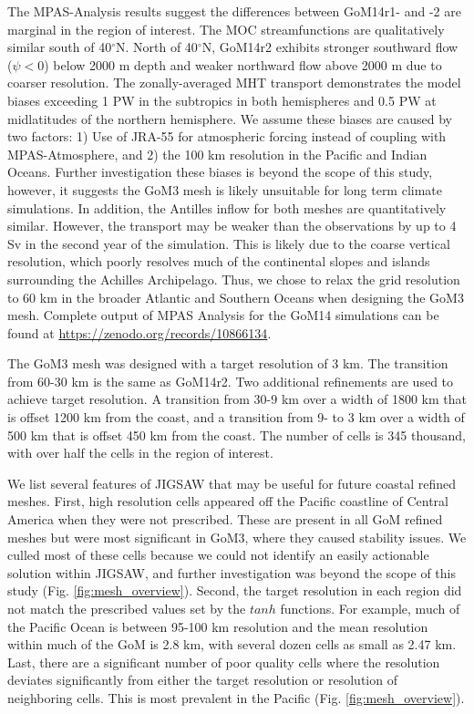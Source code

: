 The MPAS-Analysis results suggest the differences between GoM14r1- and -2 are marginal in the region of interest. The MOC streamfunctions are qualitatively similar south of 40$^\circ$N. North of 40$^\circ$N, GoM14r2 exhibits stronger southward flow ($\psi<0$) below 2000 m depth and weaker northward flow above 2000 m due to coarser resolution. The zonally-averaged MHT transport demonstrates the model biases exceeding 1 PW in the subtropics in both hemispheres and 0.5 PW at midlatitudes of the northern hemisphere. We assume these biases are caused by two factors: 1) Use of JRA-55 for atmospheric forcing instead of coupling with MPAS-Atmosphere, and 2) the 100 km resolution in the Pacific and Indian Oceans. Further investigation these biases is beyond the scope of this study, however, it suggests the GoM3 mesh is likely unsuitable for long term climate simulations. In addition, the Antilles inflow for both meshes are quantitatively similar. However, the transport may be weaker than the observations by up to 4 Sv in the second year of the simulation. This is likely due to the coarse vertical resolution, which poorly resolves much of the continental slopes and islands surrounding the Achilles Archipelago. Thus, we chose to relax the grid resolution to 60 km in the broader Atlantic and Southern Oceans when designing the GoM3 mesh. Complete output of MPAS Analysis for the GoM14 simulations can be found at \url{https://zenodo.org/records/10866134}. 

The GoM3 mesh was designed with a target resolution of 3 km. The transition from 60-30 km is the same as GoM14r2. Two additional refinements are used to achieve target resolution. A transition from 30-9 km over a width of 1800 km that is offset 1200 km from the coast, and a transition from 9- to 3 km over a width of 500 km that is offset 450 km from the coast. The number of cells is 345 thousand, with over half the cells in the region of interest. %

We list several features of JIGSAW that may be useful for future coastal refined meshes. First, high resolution cells appeared off the Pacific coastline of Central America when they were not prescribed. These are present in all GoM refined meshes but were most significant in GoM3, where they caused stability issues. We culled most of these cells because we could not identify an easily actionable solution within JIGSAW, and further investigation was beyond the scope of this study (Fig. \ref{fig:mesh_overview}). Second, the target resolution in each region did not match the prescribed values set by the $tanh$ functions. For example, much of the Pacific Ocean is between 95-100 km resolution and the mean resolution within much of the GoM is 2.8 km, with several dozen cells as small as 2.47 km. Last, there are a significant number of poor quality cells where the resolution deviates significantly from either the target resolution or resolution of neighboring cells. This is most prevalent in the Pacific (Fig. \ref{fig:mesh_overview}).


